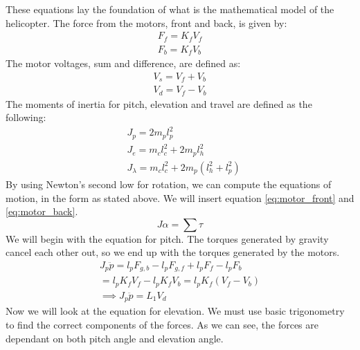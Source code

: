 These equations lay the foundation of what is the mathematical model of the helicopter.
The force from the motors, front and back, is given by:
\begin{subequations} \label{eq:motor}
    \begin{gather}
        F_f = K_f V_f \label{eq:motor_front} \\
        F_b = K_f V_b \label{eq:motor_back}
    \end{gather}
\end{subequations}
The motor voltages, sum and difference, are defined as:
\begin{subequations}\label{eq:motor_voltage}
    \begin{gather}
        V_s = V_f + V_b \label{motor_voltage_sum}\\
        V_d = V_f - V_b \label{motor_voltage_difference}
    \end{gather}
\end{subequations}
The moments of inertia for pitch, elevation and travel are defined as the following:
\begin{subequations} \label{eq:moments_inertia}
    \begin{align}
        & J_p = 2 m_p l_p^2 \\
        & J_e = m_c l_c^2 + 2 m_p l_h^2 \\
        & J_\lambda = m_c l_c^2 + 2 m_p (l_h^2 + l_p^2)
    \end{align}
\end{subequations}
By using Newton's second low for rotation, we can compute the equations of motion, in the form as stated above. We will insert equation \eqref{eq:motor_front} and \eqref{eq:motor_back}.
\begin{equation} \label{eq:newton2rot}
    J \alpha = \sum{\tau}
\end{equation}
We will begin with the equation for pitch. The torques generated by gravity cancel each other out, so we end up with the torques generated by the motors.
\begin{gather*}
    J_p \ddot{p} = l_p F_{g,b} - l_p F_{g,f} + l_p F_f - l_p F_b \\
    = l_p K_f V_f - l_p K_f V_b = l_p K_f (V_f - V_b) \\
    \implies J_p \ddot{p} = L_1 V_d
\end{gather*}
Now we will look at the equation for elevation. We must use basic trigonometry to find the correct components of the forces. As we can see, the forces are dependant on both pitch angle and elevation angle.
